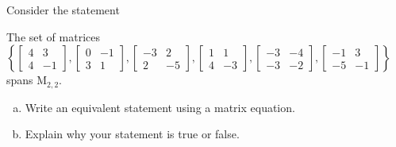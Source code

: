 
\begin{exerciseStatement}


Consider the statement 
\begin{center}\begin{minipage}{0.8\textwidth}
 The set of matrices \( \left\{ \left[\begin{array}{cc}
4 & 3 \\
4 & -1
\end{array}\right] , \left[\begin{array}{cc}
0 & -1 \\
3 & 1
\end{array}\right] , \left[\begin{array}{cc}
-3 & 2 \\
2 & -5
\end{array}\right] , \left[\begin{array}{cc}
1 & 1 \\
4 & -3
\end{array}\right] , \left[\begin{array}{cc}
-3 & -4 \\
-3 & -2
\end{array}\right] , \left[\begin{array}{cc}
-1 & 3 \\
-5 & -1
\end{array}\right] \right\} \) spans \(\mathrm{M}_{2,2}\). 
\end{minipage}\end{center}
    


\begin{enumerate}[(a)]
\item  Write an equivalent statement using a matrix equation.
\item  Explain why your statement is true or false.
\end{enumerate}
    
\end{exerciseStatement}
    
